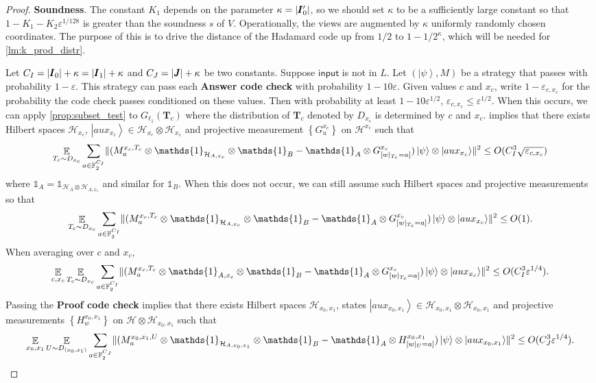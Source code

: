 \documentclass[11pt]{article}
\theoremstyle{plain}
\theoremstyle{definition}
\newcommand {\set} [1] {\ensuremath{ \left\lbrace #1 \right\rbrace }}
\DeclarePairedDelimiter{\norm}{\lVert}{\rVert}
\DeclarePairedDelimiter{\abs}{\lvert}{\rvert}
\newcommand {\ket} [1] {\ensuremath{ \left| #1 \right\rangle }}
\DeclareMathOperator*{\bigE}{\mathbb{E}}
\newcommand {\id} {\ensuremath{\mathds{1}}}
\newcommand{\ep} {\ensuremath{\varepsilon}}
\newcommand{\x}{\otimes}
\newcommand{\calH}{\mathcal{H}}
\newcommand{\1}{\mathbb{1}} %
\newcommand{\bF}{\mathbb{F}}
\newcommand{\bI}{\pmb{I}}
\newcommand{\bJ}{\pmb{J}}
\newcommand{\bT}{\pmb{T}}
\newcommand{\ipt}{\mathsf{input}}
\begin{document}
\begin{proof}
\textbf{Soundness}. The constant $K_1$ depends on the parameter $\kappa = \abs{\bI_0'}$, so we should set $\kappa$ to be a sufficiently large constant so that $1 - K_1 - K_2 \ep^{1/128}$ is greater than the soundness $s$ of $V$.
Operationally, the views are augmented by $\kappa$ uniformly randomly chosen coordinates. The purpose of this is to drive the distance of the Hadamard code up from $1/2$ to $1 - 1/2^\kappa$, which will be needed for \cref{lm:k_prod_distr}. 

Let $C_I = \abs{\bI_0} + \kappa = \abs{\bI_1} + \kappa$ and $C_J = \abs{\bJ} + \kappa$ be two constants.
Suppose $\ipt$ is not in $L$. Let $(\ket{\psi}, M)$ be a strategy that
passes with probability $1 - \ep$.
This strategy can pass each \textbf{Answer code check} with probability $1 - 10\ep$. Given values $c$ and $x_c$,
write $1 - \ep_{c,x_c}$ for the probability the code check passes conditioned on these values.
Then with probability at least $1 - 10 \ep^{1/2}$, $\ep_{c,x_c} \leq \ep^{1/2}$.
When this occurs, we can apply \cref{prop:subset_test} to $G_{\ell_1}(\bT_c)$ where the distribution of 
$\bT_c$ denoted by $D_{x_c}$ is determined by $c$ and $x_c$.
 implies that there exists Hilbert spaces $\calH_{x_c}$, $\ket{aux_{x_c}} \in \calH_{x_c} \x \calH_{x_c}$
and projective measurement $\set{ G^{x_c}_u }$ on $\calH^{x_c}$ such that
\begin{align*}
	\bigE_{T_c \sim D_{x_c}} \sum_{a \in \bF_2^{C_I}} \norm{  (M^{x_c, T_c}_a \x \id_{\calH_{A, x_c}} \x \id_B -\id_A \x G^{x_c}_{[w|_{T_c} =a]})\ket{\psi} \x \ket{aux_{x_c}}}^2
	\leq O(C_I^3\sqrt{\ep_{c,x_c}})
\end{align*}
where $\id_A = \id_{\calH_A \x \calH_{A, x_c}}$ and similar for $\id_B$.
When this does not occur, we can still assume such Hilbert spaces and projective measurements so that
\begin{align*}
	\bigE_{T_c \sim D_{x_c}} \sum_{a \in \bF_2^{C_I}} \norm{  (M^{x_c, T_c}_a \x \id_{\calH_{A, x_c}} \x \id_B -\id_A \x G^{x_c}_{[w|_{T_c} =a]})\ket{\psi} \x \ket{aux_{x_c}}}^2
	\leq O(1).
\end{align*}
When averaging over $c$ and $x_c$, 
\begin{align*}
	\bigE_{c,x_c}\bigE_{T_c \sim D_{x_c}} \sum_{a \in \bF_2^{C_I}} \norm{  (M^{x_c, T_c}_a \x \id_{A,x_c} \x \id_B -\id_A \x G^{x_c}_{[w|_{T_c} =a]})\ket{\psi} \x \ket{aux_{x_c}}}^2 \leq O(C_I^3\ep^{1/4}).
\end{align*}
Passing the \textbf{Proof code check} implies that there exists Hilbert spaces $\calH_{x_0,x_1}$, states $\ket{aux_{x_0,x_1}} \in \calH_{x_0,x_1} \x \calH_{x_0,x_1}$
and projective measurements $\set{H^{x_0,x_1}_w}$ on $\calH \x \calH_{x_0,x_1}$ such that 
\begin{align*}
	\bigE_{x_0,x_1} \bigE_{U \sim D_{(x_0,x_1)}} \sum_{a \in \bF_2^{C_J}} \norm{  (M^{x_0,x_1, U}_a \x \id_{\calH_{A, x_0,x_1}} \x \id_B -\id_A \x H^{x_0,x_1}_{[w|_{U} =a]})\ket{\psi} \x \ket{aux_{x_0,x_1}}}^2 \leq O(C_J^3\ep^{1/4}).
\end{align*}


\end{proof}
\end{document}
